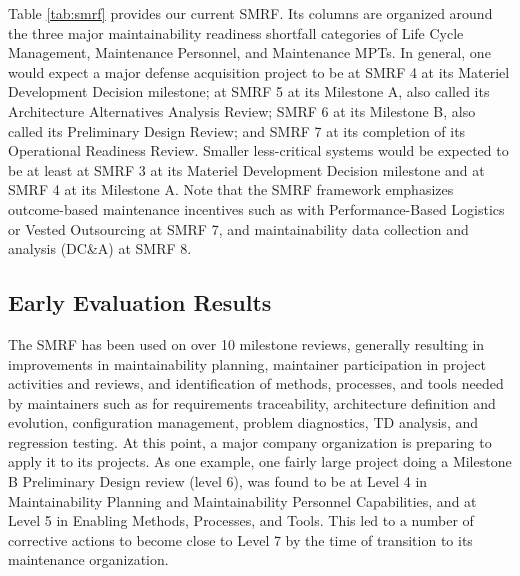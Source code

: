 Table \ref{tab:smrf} provides our current SMRF. Its columns are organized around the three major maintainability readiness shortfall categories of Life Cycle Management, Maintenance Personnel, and Maintenance MPTs. In general, one would expect a major defense acquisition project to be at SMRF 4 at its Materiel Development Decision milestone; at SMRF 5 at its Milestone A, also called its Architecture Alternatives Analysis Review; SMRF 6 at its Milestone B, also called its Preliminary Design Review; and SMRF 7 at its completion of its Operational Readiness Review. Smaller less-critical systems would be expected to be at least at SMRF 3 at its Materiel Development Decision milestone and at SMRF 4 at its Milestone A. Note that the SMRF framework emphasizes outcome-based maintenance incentives such as with Performance-Based Logistics or Vested Outsourcing \citep{vitasek2013vested} at SMRF 7, and maintainability data collection and analysis (DC\&A) at SMRF 8.



\subsection{Early Evaluation Results}
The SMRF has been used on over 10 milestone reviews, generally resulting in improvements in maintainability planning, maintainer participation in project activities and reviews, and identification  of methods, processes, and tools needed by maintainers such as  for requirements traceability, architecture definition and evolution, configuration management, problem diagnostics, TD analysis, and regression testing. At this point, a major company organization is preparing to apply it to its projects.
As one example, one fairly large project doing a Milestone B Preliminary Design review (level 6), was found to be at Level 4 in Maintainability Planning and Maintainability Personnel Capabilities, and at Level 5 in Enabling Methods, Processes, and Tools. This led to a number of corrective actions to become close to Level 7 by the time of transition to its maintenance organization.

